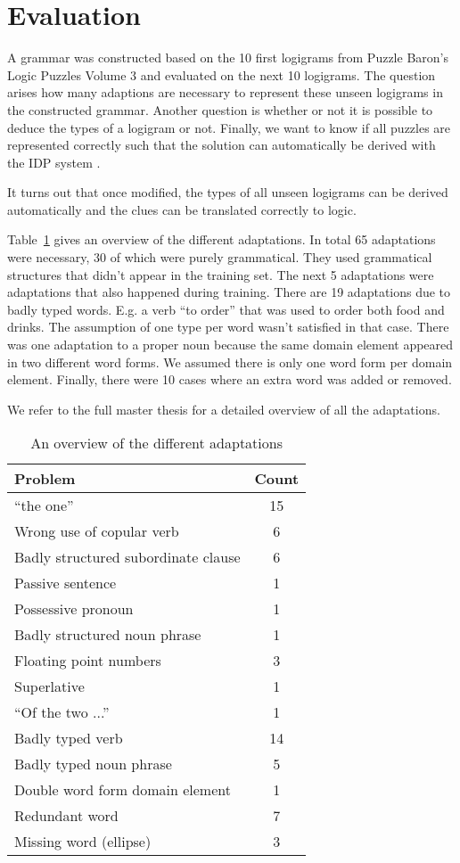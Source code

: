 \section{Evaluation}
A grammar was constructed based on the 10 first logigrams from Puzzle Baron's Logic Puzzles Volume 3 \cite{logigrammen} and evaluated on the next 10 logigrams. The question arises how many adaptions are necessary to represent these unseen logigrams in the constructed grammar. Another question is whether or not it is possible to deduce the types of a logigram or not. Finally, we want to know if all puzzles are represented correctly such that the solution can automatically be derived with the IDP system \cite{IDP}.

It turns out that once modified, the types of all unseen logigrams can be derived automatically and the clues can be translated correctly to logic.

Table~\ref{tbl:resultaten} gives an overview of the different adaptations. In total 65 adaptations were necessary, 30 of which were purely grammatical. They used grammatical structures that didn't appear in the training set. The next 5 adaptations were adaptations that also happened during training. There are 19 adaptations due to badly typed words. E.g. a verb ``to order'' that was used to order both food and drinks. The assumption of one type per word wasn't satisfied in that case. There was one adaptation to a proper noun because the same domain element appeared in two different word forms. We assumed there is only one word form per domain element. Finally, there were 10 cases where an extra word was added or removed.

We refer to the full master thesis for a detailed overview of all the adaptations.

\begin{table}[h]
  \centering
  \begin{tabular}{lc}
    \hline
    \textbf{Problem} & \textbf{Count} \\ 
    \hline
    ``the one'' & 15 \\
    Wrong use of copular verb & 6 \\
    Badly structured subordinate clause & 6 \\
    Passive sentence & 1 \\
    Possessive pronoun & 1 \\
    Badly structured noun phrase & 1 \\
    \hline
    Floating point numbers & 3 \\
    Superlative & 1 \\
    ``Of the two ...'' & 1 \\
    \hline
    Badly typed verb & 14 \\
    Badly typed noun phrase & 5 \\
    \hline
    Double word form domain element & 1 \\
    \hline
    Redundant word & 7 \\
    Missing word (ellipse) & 3 \\
    \hline
  \end{tabular}
  \caption{An overview of the different adaptations}
  \label{tbl:resultaten}
\end{table}
